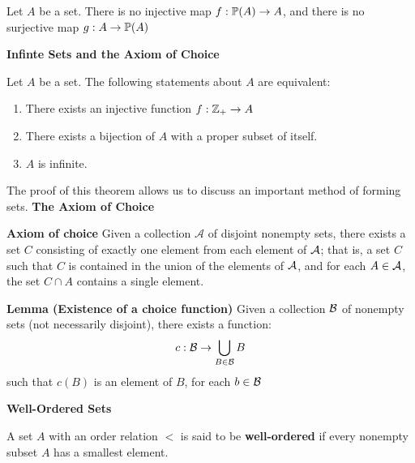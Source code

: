 \begin{thm}
	Let $ A $ be a set. There is no injective map $ f : \mathbb{P}(A)  \rightarrow A $, and there is no surjective map $ g : A \rightarrow \mathbb{P}(A) $
\end{thm}

\textbf{\LARGE Infinte Sets and the Axiom of Choice}

\begin{thm}
	Let $A$ be a set. The following statements about $A$ are equivalent:
	\begin{enumerate}
		\item There exists an injective function $ f : \mathbb{Z}_+ \rightarrow A $
		\item There exists a bijection of $A$ with a proper subset of itself.
		\item $A$ is infinite.
	\end{enumerate}
\end{thm}

The proof of this theorem allows us to discuss an important method of forming sets. \textbf{The Axiom of Choice}

\textbf{Axiom of choice} Given a collection $ \mathcal{A} $ of disjoint nonempty sets, there exists a set $ C $ consisting of exactly one element from each element of $ \mathcal{A} $; that is, a set $C$ such that $C$ is contained in the union of the elements of  $ \mathcal{A} $, and for each $ A \in \mathcal{A} $, the set $C \cap A$ contains a single element.

\textbf{Lemma (Existence of a choice function)} Given a collection $ \mathcal{B} $ of nonempty sets (not necessarily disjoint), there exists a function:
\[ c : \mathcal{B} \rightarrow \bigcup_{B \in \mathcal{B}}B \]
such that $ c(B) $ is an element of $B$, for each $b \in \mathcal{B}$

\textbf{\LARGE Well-Ordered Sets}

\begin{define}
	A set $A$ with an order relation $ < $ is said to be \textbf{well-ordered} if every nonempty subset $A$ has a smallest element.
\end{define}
